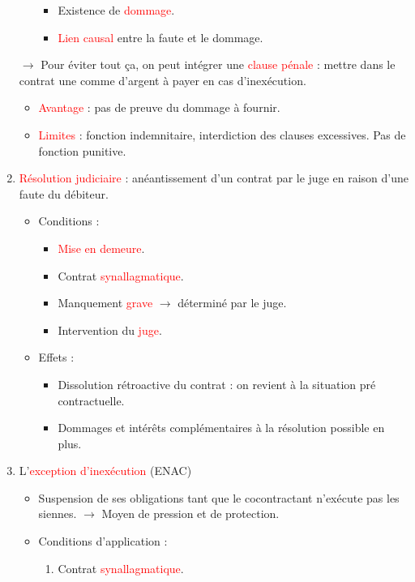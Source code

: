 \begin{enumerate}
\begin{itemize}
\begin{itemize}
			\item Existence de \textcolor{red}{dommage}.
			\item \textcolor{red}{Lien causal} entre la faute et le dommage.
		\end{itemize}
	\end{itemize}
	$\rightarrow$ Pour éviter tout ça, on peut intégrer une \textcolor{red}{clause pénale} : mettre dans le contrat une comme d'argent à payer en cas d'inexécution.
	\begin{itemize}
		\item \textcolor{red}{Avantage} : pas de preuve du dommage à fournir.
		\item \textcolor{red}{Limites} : fonction indemnitaire, interdiction des clauses excessives. Pas de fonction punitive.
	\end{itemize}
	\item \textcolor{red}{Résolution judiciaire} : anéantissement d'un contrat par le juge en raison d'une faute du débiteur.
	\begin{itemize}
		\item Conditions :
		\begin{itemize}
			\item \textcolor{red}{Mise en demeure}.
			\item Contrat \textcolor{red}{synallagmatique}.
			\item Manquement \textcolor{red}{grave} $\rightarrow$ déterminé par le juge.
			\item Intervention du \textcolor{red}{juge}.
		\end{itemize}
		\item Effets :
		\begin{itemize}
			\item Dissolution rétroactive du contrat : on revient à la situation pré contractuelle.
			\item Dommages et intérêts complémentaires à la résolution possible en plus.
		\end{itemize}
	\end{itemize}
	\item L'\textcolor{red}{exception d'inexécution} (ENAC)
	\begin{itemize}
		\item Suspension de ses obligations tant que le cocontractant n'exécute pas les siennes. $\rightarrow$ Moyen de pression et de protection.
		\item Conditions d'application :
		\begin{enumerate}
			\item Contrat \textcolor{red}{synallagmatique}.

\end{enumerate}
\end{itemize}
\end{enumerate}
